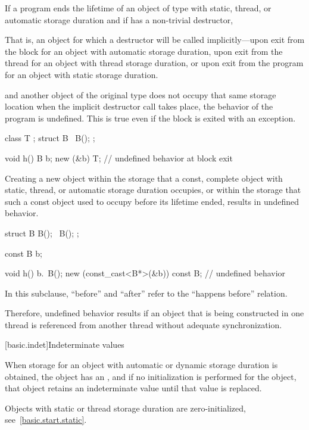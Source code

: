 \pnum
If a program ends the lifetime of an object of type  with
static, thread,
or automatic
storage duration and if  has a non-trivial destructor,
\begin{footnote}
That
is, an object for which a destructor will be called
implicitly---upon exit from the block for an object with
automatic storage duration, upon exit from the thread for an object with
thread storage duration, or upon exit from the program for an object
with static storage duration.
\end{footnote}
and another object of the original type does not occupy
that same storage location when the implicit destructor call takes
place, the behavior of the program is undefined. This is true
even if the block is exited with an exception.
\begin{example}
\begin{codeblock}
class T { };
struct B {
   ~B();
};

void h() {
   B b;
   new (&b) T;
}                               // undefined behavior at block exit
\end{codeblock}
\end{example}

\pnum
Creating a new object within the storage that a const, complete
object with static, thread, or automatic storage duration occupies,
or within the storage that such a const object used to occupy before
its lifetime ended, results in undefined behavior.
\begin{example}
\begin{codeblock}
struct B {
  B();
  ~B();
};

const B b;

void h() {
  b.~B();
  new (const_cast<B*>(&b)) const B;     // undefined behavior
}
\end{codeblock}
\end{example}

\pnum
In this subclause, ``before'' and ``after'' refer to the ``happens before''
relation.
\begin{note}
Therefore, undefined behavior results
if an object that is being constructed in one thread is referenced from another
thread without adequate synchronization.
\end{note}

[basic.indet]{Indeterminate values}

\pnum
{}%
%
When storage for an object with automatic or dynamic storage duration
is obtained, the object has an , and if
no initialization is performed for the object, that object retains an
indeterminate value until that value is replaced.
\begin{note}
Objects with static or thread storage duration are zero-initialized,
see~\ref{basic.start.static}.
\end{note}

